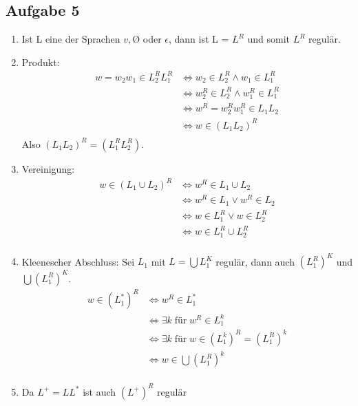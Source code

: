 \subsection*{Aufgabe 5}
\begin{enumerate}
  \item Ist L eine der Sprachen ${v}, Ø$ oder ${\epsilon}$, dann ist L = $L^R$ und somit $L^R$ regulär.
  \item Produkt:
  \begin{align*}
    w = w_2w_1 \in L_2^R L_1^R &\iff w_2 \in L_2^R \land w_1 \in L_1^R \\
    &\iff w_2^R \in L_2^R \land w_1^R \in L_1^R \\
    &\iff w^R = w_2^R w_1^R \in L_1 L_2 \\
    &\iff w \in (L_1 L_2)^R \\
  \end{align*}
  Also $(L_1 L_2)^R = (L_1^R L_2^R)$.

  \item Vereinigung:
  \begin{align*}
    w \in (L_1 \cup L_2)^R &\iff w^R \in L_1 \cup L_2 \\
    &\iff w^R \in L_1 \lor w^R \in L_2  \\
    &\iff w \in L_1^R \lor w \in L_2^R \\
    &\iff w \in L_1^R \cup L_2^R \\
  \end{align*}


  \item Kleenescher Abschluss:
  Sei $L_1$ mit $L=\bigcup L_1^K$ regulär, dann auch $(L_1^R)^K$ und $\bigcup (L_1^R)^K$.
  \begin{align*}
    w \in (L_1^*)^R &\iff w^R \in L_1^* \\
    &\iff \exists k \; \text{für} \; w^R \in L_1^k \\
    &\iff \exists k \; \text{für} \; w \in (L_1^k)^R = (L_1^R)^k \\
    &\iff w \in \bigcup (L_1^R)^k \\
  \end{align*}

  \item Da $L^+ = LL^*$ ist auch $(L^+)^R$ regulär

\end{enumerate}
